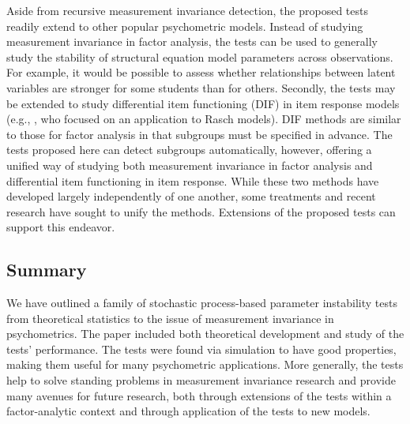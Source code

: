 \documentclass[man]{apa}
\begin{document}
Aside from recursive measurement invariance detection, the proposed tests
readily extend to other popular psychometric models.  
Instead of studying measurement invariance in factor
analysis, the tests can be used to generally 
study the stability of structural equation model parameters across
observations.  For 
example, it would be possible to assess whether relationships between
latent variables are stronger for some students than for
others.  Secondly, 
the tests may be extended to study differential item functioning (DIF)
in item response models (e.g., , who focused on an
application to Rasch models).  
DIF methods are similar to those for factor analysis in
that subgroups must be specified in advance.  The tests proposed here
can detect subgroups automatically, however, offering a unified way of
studying both 
measurement invariance in factor analysis and differential item
functioning in item response.  While these
two methods have developed largely independently of one another,
some treatments \cite{Mcd99} and recent research \cite{StaChe06} have
sought to unify the methods.  Extensions of the proposed tests can
support this endeavor.

\subsection{Summary}
We have outlined a family of 
stochastic process-based parameter instability tests from theoretical
statistics to the issue of measurement invariance in psychometrics.
The paper included both theoretical development and 
study of the tests' performance.  The tests were found via simulation
to have good properties, making them useful for many psychometric
applications.  More generally, the tests help to
solve standing problems in
measurement invariance research and provide many avenues for
future research, both through extensions of the tests within a
factor-analytic context and through application of the tests to new
models.


\end{document}
